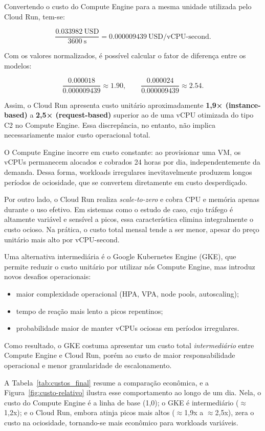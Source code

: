 Convertendo o custo do Compute Engine para a mesma unidade utilizada pelo Cloud
Run, tem-se:

\[
\frac{0.033982~\text{USD}}{3600~\text{s}} = 0.000009439~\text{USD/vCPU-second}.
\]

Com os valores normalizados, é possível calcular o fator de diferença entre os
modelos:

\[
\frac{0.000018}{0.000009439} \approx 1.90,
\qquad
\frac{0.000024}{0.000009439} \approx 2.54.
\]

Assim, o Cloud Run apresenta custo unitário aproximadamente \textbf{1{,}9×
(instance-based)} a \textbf{2{,}5× (request-based)} superior ao de uma vCPU
otimizada do tipo C2 no Compute Engine. Essa discrepância, no entanto, não
implica necessariamente maior custo operacional total.

O Compute Engine incorre em custo constante: ao provisionar uma VM, os vCPUs
permanecem alocados e cobrados 24 horas por dia, independentemente da demanda.
Dessa forma, workloads irregulares inevitavelmente produzem longos períodos de
ociosidade, que se convertem diretamente em custo desperdiçado.

Por outro lado, o Cloud Run realiza \textit{scale-to-zero} e cobra CPU e memória
apenas durante o uso efetivo. Em sistemas como o estudo de caso, cujo tráfego é
altamente variável e sensível a picos, essa característica elimina integralmente
o custo ocioso. Na prática, o custo total mensal tende a ser menor, apesar do
preço unitário mais alto por vCPU-second.

Uma alternativa intermediária é o Google Kubernetes Engine (GKE), que permite
reduzir o custo unitário por utilizar nós Compute Engine, mas introduz novos
desafios operacionais:

\begin{itemize}
    \item maior complexidade operacional (HPA, VPA, node pools, autoscaling);
    \item tempo de reação mais lento a picos repentinos;
    \item probabilidade maior de manter vCPUs ociosas em períodos irregulares.
\end{itemize}

Como resultado, o GKE costuma apresentar um custo total \textit{intermediário}
entre Compute Engine e Cloud Run, porém ao custo de maior responsabilidade
operacional e menor granularidade de escalonamento.

A Tabela~\ref{tab:custos_final} resume a comparação econômica, e a
Figura~\ref{fig:custo-relativo} ilustra esse comportamento ao longo de um dia.
Nela, o custo do Compute Engine é a linha de base (1,0); o GKE é intermediário
($\approx$1,2x); e o Cloud Run, embora atinja picos mais altos ($\approx$1,9x a
$\approx$2,5x), zera o custo na ociosidade, tornando-se mais econômico para
workloads variáveis.

